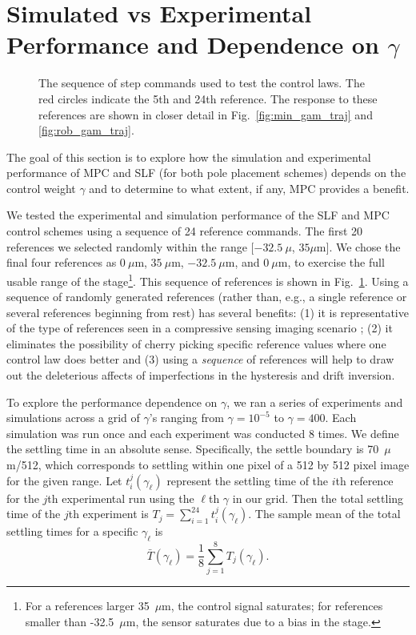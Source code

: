 \documentclass[twocolumn,twoside]{IEEEtran}
\begin{document}
\section{Simulated vs Experimental Performance and Dependence on $\gamma$}\label{sec:results}
\begin{figure}[ht!]
  
  \caption{The sequence of step commands used to test the control laws. The red circles indicate the 5th and 24th reference. The response to these references are shown in closer detail in Fig.~\ref{fig:min_gam_traj} and \ref{fig:rob_gam_traj}.}
  \label{fig:steps}
\end{figure}
The goal of this section is to explore how the simulation and experimental performance of MPC and SLF (for both pole placement schemes) depends on the control weight $\gamma$ and to determine to what extent, if any, MPC provides a benefit.

We tested the experimental and simulation performance of the SLF and MPC control schemes using 
a sequence of 24 reference commands. The first 20 references we selected randomly within the range $[-32.5~\mu$, $35\mu\text{m}]$. We chose the final four references as $0~\mu$m, $35~\mu$m, $-32.5~\mu$m, and $0~\mu$m, to exercise the full usable range of the stage\footnote{For a references larger 35~$\mu$m, the control signal saturates; for references smaller than -32.5~$\mu$m, the sensor saturates due to a bias in the stage.}. This sequence of references is shown in Fig.~\ref{fig:steps}. Using a sequence of randomly generated references (rather than, e.g., a single reference or several references beginning from rest) has several benefits: (1) it is representative of the type of references seen in a compressive sensing imaging scenario \cite{braker_hardware_2018}; (2) it eliminates the possibility of cherry picking specific reference values where one control law does better and (3) using a \emph{sequence} of references will help to draw out the deleterious affects of imperfections in the hysteresis and drift inversion.

To explore the performance dependence on $\gamma$, we ran a series of experiments and simulations across a grid of $\gamma$'s ranging from $\gamma=10^{-5}$ to $\gamma=400$. 
Each simulation was run once and each experiment was conducted 8 times. 
We define the settling time in an absolute sense. Specifically, the settle boundary is 70~$\mu$m/512, which corresponds to settling within one pixel of a 512 by 512 pixel image for the given range.
Let $t_i^j(\gamma_{\ell})$ represent the settling time of the $i$th reference for the $j$th experimental run using the $\ell$th $\gamma$ in our grid. Then the total settling time of the $j$th experiment is $T_j = \sum_{i=1}^{24} t_i^j(\gamma_{\ell})$. The sample mean of the total settling times for a specific $\gamma_{\ell}$ is
\begin{equation}
  \bar{T}(\gamma_{\ell}) = \frac{1}{8}\sum_{j=1}^8 T_j(\gamma_{\ell}).
\end{equation}
\end{document}
